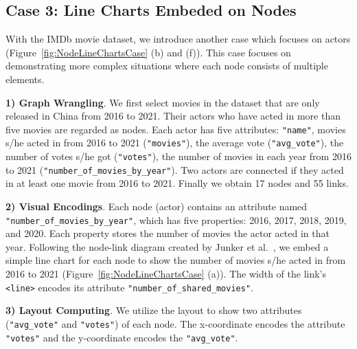 \subsection{Case 3: Line Charts Embeded on Nodes}
With the IMDb movie dataset, we introduce another case which focuses on actors (Figure~\ref{fig:NodeLineChartsCase} (b) and (f)).
This case focuses on demonstrating more complex situations where each node consists of multiple elements.

\textbf{1) Graph Wrangling}. We first select movies in the dataset that are only released in China from 2016 to 2021.
Their actors who have acted in more than five movies are regarded as nodes.
Each actor has five attributes: \texttt{"name"}, movies s/he acted in from 2016 to 2021 (\texttt{"movies"}), the average vote (\texttt{"avg\_vote"}), the number of votes s/he got (\texttt{"votes"}), the number of movies in each year from 2016 to 2021 (\texttt{"number\_of\_movies\_by\_year"}).
Two actors are connected if they acted in at least one movie from 2016 to 2021.
Finally we obtain 17 nodes and 55 links.

\textbf{2) Visual Encodings}. 
Each node (actor) contains an attribute named \texttt{"number\_of\_movies\_by\_year"}, which has five properties: 2016, 2017, 2018, 2019, and 2020.
Each property stores the number of movies the actor acted in that year.
Following the node-link diagram created by Junker et al.~\cite{DBLP:journals/bmcbi/JunkerKS06}, 
we embed a simple line chart for each node to show the number of movies s/he acted in from 2016 to 2021 (Figure~\ref{fig:NodeLineChartsCase} (a)). 
The width of the link's \texttt{<line>} encodes its attribute \texttt{"number\_of\_shared\_movies"}.

\textbf{3) Layout Computing}. We utilize the layout to show two attributes (\texttt{"avg\_vote"} and \texttt{"votes"}) of each node. The x-coordinate encodes the attribute \texttt{"votes"} and the y-coordinate encodes the \texttt{"avg\_vote"}.

